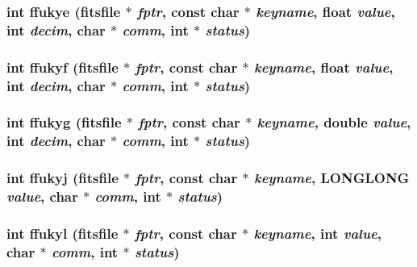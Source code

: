 \subsubsection{\setlength{\rightskip}{0pt plus 5cm}int ffukye (\bf{fitsfile} $\ast$ {\em fptr}, const char $\ast$ {\em keyname}, float {\em value}, int {\em decim}, char $\ast$ {\em comm}, int $\ast$ {\em status})}\label{fitsio_8h_7d74546a4ae0316680f0d5b12899f2a5}


\subsubsection{\setlength{\rightskip}{0pt plus 5cm}int ffukyf (\bf{fitsfile} $\ast$ {\em fptr}, const char $\ast$ {\em keyname}, float {\em value}, int {\em decim}, char $\ast$ {\em comm}, int $\ast$ {\em status})}\label{fitsio_8h_7e2a06ea877d0f925b262790562ddfee}


\subsubsection{\setlength{\rightskip}{0pt plus 5cm}int ffukyg (\bf{fitsfile} $\ast$ {\em fptr}, const char $\ast$ {\em keyname}, double {\em value}, int {\em decim}, char $\ast$ {\em comm}, int $\ast$ {\em status})}\label{fitsio_8h_5a1f266c010c12d806f4ce4798d09899}


\subsubsection{\setlength{\rightskip}{0pt plus 5cm}int ffukyj (\bf{fitsfile} $\ast$ {\em fptr}, const char $\ast$ {\em keyname}, \bf{LONGLONG} {\em value}, char $\ast$ {\em comm}, int $\ast$ {\em status})}\label{fitsio_8h_bafdc68a536acb7394eecdff9716469d}


\subsubsection{\setlength{\rightskip}{0pt plus 5cm}int ffukyl (\bf{fitsfile} $\ast$ {\em fptr}, const char $\ast$ {\em keyname}, int {\em value}, char $\ast$ {\em comm}, int $\ast$ {\em status})}\label{fitsio_8h_87a441e58e003c3ffe935433f47fe619}


